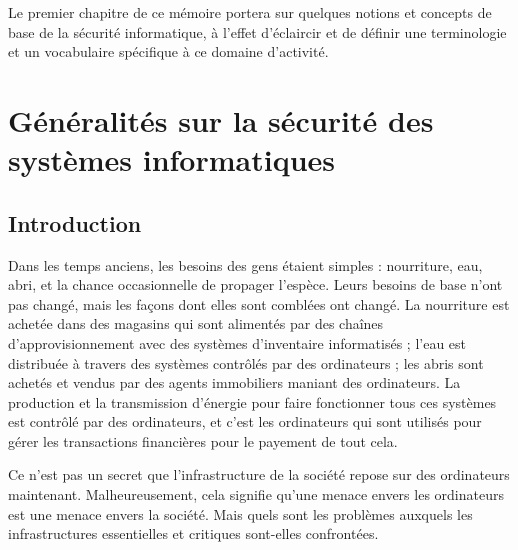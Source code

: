 
Le premier chapitre de ce mémoire portera sur quelques notions et concepts de base de la 
sécurité informatique, à l’effet d’éclaircir et de définir une terminologie et un vocabulaire 
spécifique à ce domaine d’activité. %

\newpage

\section{Généralités sur la sécurité des systèmes informatiques}
    \subsection{Introduction}
    Dans les temps anciens, les besoins des gens étaient simples : nourriture, eau, abri, et la chance occasionnelle
    de propager l'espèce. Leurs besoins de base n'ont pas changé, mais les façons dont elles sont comblées ont changé.
    La nourriture est achetée dans des magasins qui sont alimentés par des chaînes d'approvisionnement avec des
    systèmes d'inventaire informatisés ; l'eau est distribuée à travers des systèmes contrôlés par des ordinateurs ; 
    les abris sont achetés et vendus par des agents immobiliers maniant des ordinateurs.
    La production et la transmission d'énergie pour faire fonctionner tous ces systèmes est contrôlé par des
    ordinateurs, et c'est les ordinateurs qui sont utilisés pour gérer les transactions financières pour le 
    payement de tout cela. \cite{virus} %

    Ce n'est pas un secret que l'infrastructure de la société repose sur des ordinateurs maintenant.
    Malheureusement, cela signifie qu'une menace envers les ordinateurs est une menace envers la société. 
    Mais quels sont les problèmes auxquels les infrastructures essentielles et critiques sont-elles confrontées.%

